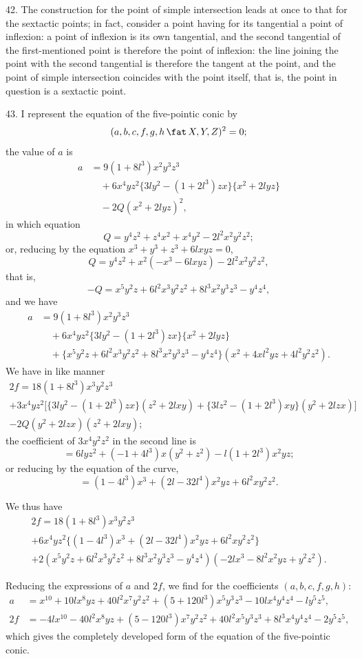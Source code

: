 \documentclass[11pt,a4paper]{book}
\begin{document}
42. The construction for the point of simple intersection leads at once to that for the sextactic points; in fact, consider a point having for its tangential a point of inflexion: a point of inflexion is its own tangential, and the second tangential of the first-mentioned point is therefore the point of inflexion: the line joining the point with the second tangential is therefore the tangent at the point, and the point of simple intersection coincides with the point itself, that is, the point in question is a sextactic point.

43. I represent the equation of the five-pointic conic by
\[
(a,b,c,f,g,h\,\fat\, X,Y,Z)^2=0;
\]
the value of $a$ is
\begin{align*}
a &= 9(1+8l^3)x^2y^3z^3\\
&\quad +6x^4yz^2\{3ly^2-(1+2l^3)zx\}\{x^2+2lyz\}\\
&\quad -2Q(x^2+2lyz)^2,
\end{align*}
in which equation
\[
Q = y^4z^2+z^4x^2+x^4y^2-2l^2x^2y^2z^2;
\]
or, reducing by the equation $x^3+y^3+z^3+6lxyz=0$,
\[
Q = y^4z^2+x^2(-x^3-6lxyz)-2l^2x^2y^2z^2,
\]
that is,
\[
-Q = x^5y^2z+6l^2x^3y^2z^2+8l^3x^2y^3z^3-y^4z^4,
\]
and we have
\begin{align*}
a &= 9(1+8l^3)x^2y^3z^3\\
&\quad +6x^4yz^2\{3ly^2-(1+2l^3)zx\}\{x^2+2lyz\}\\
&\quad +\{x^5y^2z+6l^2x^3y^2z^2+8l^3x^2y^3z^3-y^4z^4\}(x^2+4xl^2yz+4l^2y^2z^2).
\end{align*}
We have in like manner
\begin{multline*}
2f = 18(1+8l^3)x^3y^2z^3\\
+3x^4yz^2\bigl[\{3ly^2-(1+2l^3)zx\}(z^2+2lxy)+\{3lz^2-(1+2l^3)xy\}(y^2+2lzx)\bigr]\\
-2Q(y^2+2lzx)(z^2+2lxy);
\end{multline*}
the coefficient of $3x^4y^2z^2$ in the second line is
\[
= 6lyz^2+(-1+4l^3)x(y^2+z^2)-l(1+2l^3)x^2yz;
\]
or reducing by the equation of the curve,
\[
= (1-4l^3)x^3+(2l-32l^4)x^2yz+6l^2xy^2z^2.
\]

We thus have
\begin{multline*}
2f=18(1+8l^3)x^3y^2z^3\\
+6x^4yz^2\{(1-4l^3)x^3+(2l-32l^4)x^2yz+6l^2xy^2z^2\}\\
+2(x^5y^2z+6l^2x^3y^2z^2+8l^3x^2y^3z^3-y^4z^4)(-2lx^3-8l^2x^2yz+y^2z^2).
\end{multline*}

Reducing the expressions of $a$ and $2f$, we find for the coefficients $(a,b,c,f,g,h)$:
\begin{align*}
a &= x^{10}+10lx^8yz+40l^2x^7y^2z^2+(5+120l^3)x^5y^3z^3-10lx^4y^4z^4-ly^5z^5,\\
2f &= -4lx^{10}-40l^2x^8yz+(5-120l^3)x^7y^2z^2+40l^2x^5y^3z^3+8l^3x^4y^4z^4-2y^5z^5,
\end{align*}
which gives the completely developed form of the equation of the five-pointic conic.
\end{document}
